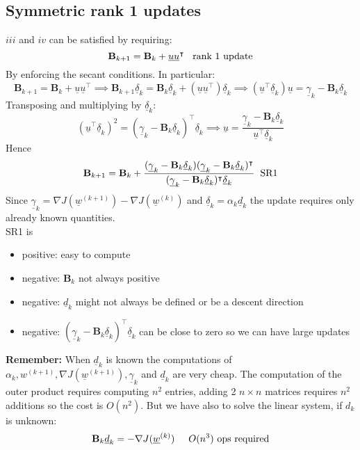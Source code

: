\subsection{Symmetric rank 1 updates}
$iii$ and $iv$ can be satisfied by requiring:
\[
    \mathbf{B}_{k+1} = \mathbf{B}_k + \underline{u}\underline{u}^\intercal \hspace{0.3cm} \text{rank 1 update}   
\]
By enforcing the secant conditions. In particular:
\[
    \mathbf{B}_{k+1} = \mathbf{B}_k + \underline{u}\underline{u}^\intercal \implies \mathbf{B}_{k+1} \underline{\delta}_k = \mathbf{B}_k \underline{\delta}_k + (\underline{u}\underline{u}^\intercal) \underline{\delta}_k \implies (\underline{u}^\intercal \underline{\delta}_k)\underline{u} = \underline{\gamma}_k - \mathbf{B}_k \underline{\delta}_k
\]
Transposing and multiplying by $\underline{\delta}_k$:
\[
    (\underline{u}^\intercal \underline{\delta}_k)^2 = (\underline{\gamma}_k - \mathbf{B}_k\underline{\delta}_k)^\intercal \underline{\delta}_k \implies \underline{u} = \frac{\underline{\gamma}_k - \mathbf{B}_k\underline{\delta}_k}{\underline{u}^\intercal \underline{\delta}_k}    
\]
Hence
\[
    \mathbf{B}_{k+1} = \mathbf{B}_k + \frac{(\underline{\gamma}_k - \mathbf{B}_k\underline{\delta}_k)(\underline{\gamma}_k - \mathbf{B}_k\underline{\delta}_k)^\intercal}{(\underline{\gamma}_k - \mathbf{B}_k\underline{\delta}_k)^\intercal \underline{\delta}_k}    \hspace{0.2cm} \text{SR1}
\]
Since $\underline{\gamma}_k = \nabla J (\underline{w}^{(k+1)}) - \nabla J (\underline{w}^{(k)})$ and $\underline{\delta}_k = \alpha_k \underline{d}_k$ the update requires only already known quantities.\\

SR1 is 
\begin{itemize}
    \item positive: easy to compute
    \item negative: $\mathbf{B}_k$ not always positive
    \item negative: $\underline{d}_k$ might not always be defined or be a descent direction
    \item negative: $(\underline{\gamma}_k - \mathbf{B}_k\underline{\delta}_k)^\intercal\underline{\delta}_k$ can be close to zero so we can have large updates
\end{itemize}

\textbf{Remember: } When $\underline{d}_k$ is known the computations of $\alpha_k, w^{(k+1)},\nabla J(\underline{w}^{(k+1)}), \underline{\gamma}_k$ and $\underline{d}_k$ are very cheap. The computation of the outer product requires computing $n^2$ entries, adding 2 $n\times n$ matrices requires $n^2$ additions so the cost is $O(n^2)$. But we have also to solve the linear system, if $d_k$ is unknown:
\[
    \mathbf{B}_k\underline{d}_k = - \nabla J(\underline{w}^{(k)})\hspace{0.5cm} O(n^3)\text{ ops required}    
\]

